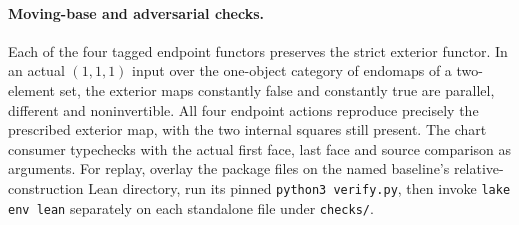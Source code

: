 \paragraph{Moving-base and adversarial checks.} Each of the four tagged
endpoint functors preserves the strict exterior functor. In an actual
$(1,1,1)$ input over the one-object category of endomaps of a two-element
set, the exterior maps constantly false and constantly true are parallel,
different and noninvertible. All four endpoint actions reproduce precisely
the prescribed exterior map, with the two internal squares still present.
The chart consumer typechecks with the actual first face, last face and
source comparison as arguments. For replay, overlay the package files on
the named baseline's relative-construction Lean directory, run its pinned
\texttt{python3 verify.py}, then invoke \texttt{lake env lean} separately
on each standalone file under \texttt{checks/}.
